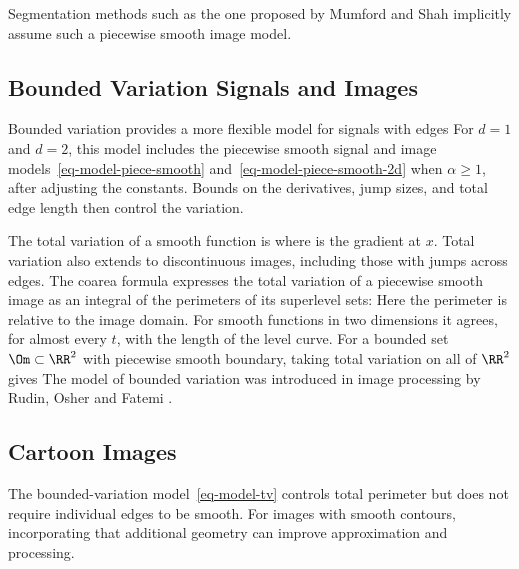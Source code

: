 Segmentation methods such as the one proposed by Mumford and Shah \cite{mumford-shah} implicitly assume such a piecewise smooth image model.

\subsection{Bounded Variation Signals and Images}
\label{subsec-bv-model}

Bounded variation provides a more flexible model for signals with edges
For $d=1$ and $d=2$, this model includes the piecewise smooth signal and image models~\eqref{eq-model-piece-smooth} and~\eqref{eq-model-piece-smooth-2d} when $\alpha\geq1$, after adjusting the constants. Bounds on the derivatives, jump sizes, and total edge length then control the variation.

The total variation of a smooth function is 
where 
is the gradient at $x$. Total variation also extends to discontinuous images, including those with jumps across edges. The coarea formula expresses the total variation of a piecewise smooth image as an integral of the perimeters of its superlevel sets:
Here the perimeter is relative to the image domain. For smooth functions in two dimensions it agrees, for almost every $t$, with the length of the level curve. For a bounded set $\Om\subset\RR^2$ with piecewise smooth boundary, taking total variation on all of $\RR^2$ gives
The model of bounded variation was introduced in image processing by Rudin, Osher and Fatemi \cite{rudin-tv}.

\subsection{Cartoon Images}
\label{subsec-cartoon-images}

The bounded-variation model~\eqref{eq-model-tv} controls total perimeter but does not require individual edges to be smooth. For images with smooth contours, incorporating that additional geometry can improve approximation and processing.

